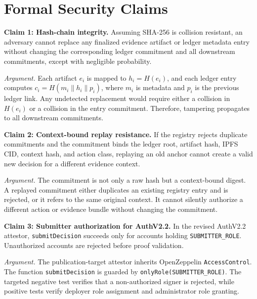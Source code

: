 \section{Formal Security Claims}

\textbf{Claim 1: Hash-chain integrity.}
Assuming SHA-256 is collision resistant, an adversary cannot replace any finalized evidence artifact or ledger metadata entry without changing the corresponding ledger commitment and all downstream commitments, except with negligible probability.

\textit{Argument.}
Each artifact $e_i$ is mapped to $h_i = H(e_i)$, and each ledger entry computes $c_i = H(m_i \parallel h_i \parallel p_i)$, where $m_i$ is metadata and $p_i$ is the previous ledger link. Any undetected replacement would require either a collision in $H(e_i)$ or a collision in the entry commitment. Therefore, tampering propagates to all downstream commitments.

\textbf{Claim 2: Context-bound replay resistance.}
If the registry rejects duplicate commitments and the commitment binds the ledger root, artifact hash, IPFS CID, context hash, and action class, replaying an old anchor cannot create a valid new decision for a different evidence context.

\textit{Argument.}
The commitment is not only a raw hash but a context-bound digest. A replayed commitment either duplicates an existing registry entry and is rejected, or it refers to the same original context. It cannot silently authorize a different action or evidence bundle without changing the commitment.

\textbf{Claim 3: Submitter authorization for AuthV2.2.}
In the revised AuthV2.2 attestor, \texttt{submitDecision} succeeds only for accounts holding \texttt{SUBMITTER\_ROLE}. Unauthorized accounts are rejected before proof validation.

\textit{Argument.}
The publication-target attestor inherits OpenZeppelin \texttt{AccessControl}. The function \texttt{submitDecision} is guarded by \texttt{onlyRole(SUBMITTER\_ROLE)}. The targeted negative test verifies that a non-authorized signer is rejected, while positive tests verify deployer role assignment and administrator role granting.
